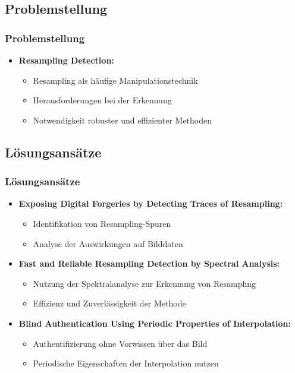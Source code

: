 \documentclass[11pt,t,usepdftitle=false,aspectratio=169]{beamer}
\begin{document}
\subsection{Problemstellung}

\begin{frame}
	\frametitle{Problemstellung}
	\begin{itemize}
		\item \textbf{Resampling Detection:} 
		\begin{itemize}
			\item Resampling als häufige Manipulationstechnik
			\item Herausforderungen bei der Erkennung
			\item Notwendigkeit robuster und effizienter Methoden
		\end{itemize}
	\end{itemize}
\end{frame}

\subsection{Lösungsansätze}

\begin{frame}
	\frametitle{Lösungsansätze}
	\begin{itemize}
		\item \textbf{Exposing Digital Forgeries by Detecting Traces of Resampling:} 
		\begin{itemize}
			\item Identifikation von Resampling-Spuren
			\item Analyse der Auswirkungen auf Bilddaten
		\end{itemize}
		\item \textbf{Fast and Reliable Resampling Detection by Spectral Analysis:} 
		\begin{itemize}
			\item Nutzung der Spektralanalyse zur Erkennung von Resampling
			\item Effizienz und Zuverlässigkeit der Methode
		\end{itemize}
		\item \textbf{Blind Authentication Using Periodic Properties of Interpolation:} 
		\begin{itemize}
			\item Authentifizierung ohne Vorwissen über das Bild
			\item Periodische Eigenschaften der Interpolation nutzen
		\end{itemize}
	\end{itemize}
\end{frame}
\end{document}

